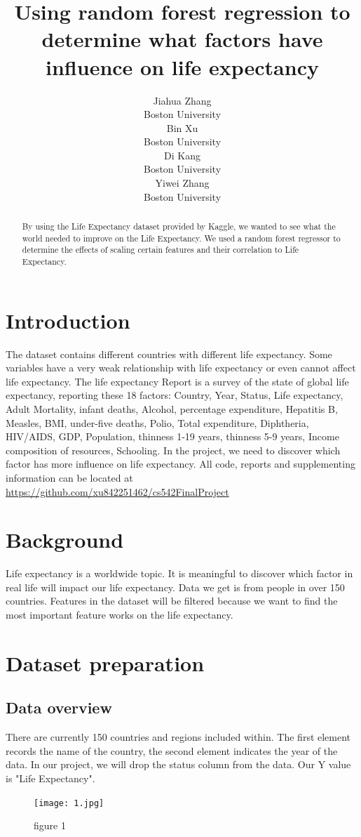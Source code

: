\documentclass{article}
\title{Using random forest regression to determine what factors have influence on life expectancy}
\author{
  Jiahua Zhang\\
  Boston University\\
  \And
  Bin Xu\\
  Boston University\\
  \And
  Di Kang\\
  Boston University\\
  \And
  Yiwei Zhang\\
  Boston University\\
}
\begin{document}
\maketitle

\begin{abstract}
  By using the Life Expectancy dataset provided by Kaggle, we wanted to see what the world needed to improve on the Life Expectancy. We used a random forest regressor to determine the effects of scaling certain features and their correlation to Life Expectancy.
\end{abstract}

\section{Introduction}
The dataset contains different countries with different life expectancy. Some variables have a very weak relationship with life expectancy or even cannot affect life expectancy. The life expectancy Report is a survey of the state of global life expectancy, reporting these 18 factors: Country, Year, Status, Life expectancy, Adult Mortality, infant deaths, Alcohol, percentage expenditure, Hepatitis B, Measles, BMI, under-five deaths, Polio, Total expenditure, Diphtheria, HIV/AIDS, GDP, Population, thinness 1-19 years, thinness 5-9 years, Income composition of resources, Schooling. In the project, we need to discover which factor has more influence on life expectancy.  All code, reports and supplementing information can be located at \url{https://github.com/xu842251462/cs542FinalProject}


\section{Background}
Life expectancy is a worldwide topic. It is meaningful to discover which factor in real life will impact our life expectancy. Data we get is from people in over 150 countries. Features in the dataset will be filtered because we want to find the most important feature works on the life expectancy.

\section{Dataset preparation}
\subsection{Data overview}
There are currently 150 countries and regions included within. The first element records the name of the country, the second element indicates the year of the data. In our project, we will drop the status column from the data. Our Y value is "Life Expectancy".
\begin{figure}[H]
    \centering
    \texttt{[image: 1.jpg]}
    \caption{figure 1}
\end{figure}
\end{document}
